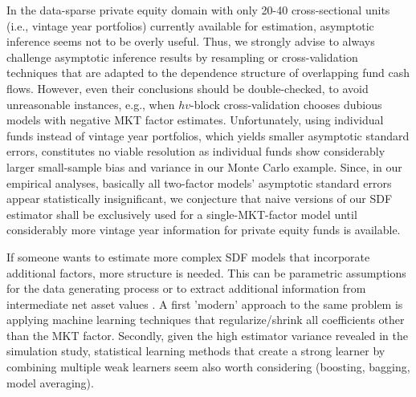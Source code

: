\documentclass[12pt]{article}
\begin{document}
In the data-sparse private equity domain with only 20-40 cross-sectional units (i.e., vintage year portfolios) currently available for estimation, asymptotic inference seems not to be overly useful.
Thus, we strongly advise to always challenge asymptotic inference results by resampling or cross-validation techniques that are adapted to the dependence structure of overlapping fund cash flows.
However, even their conclusions should be double-checked, to avoid unreasonable instances, e.g., when $hv$-block cross-validation chooses dubious models with negative MKT factor estimates.
Unfortunately, using individual funds instead of vintage year portfolios, which yields smaller asymptotic standard errors, constitutes no viable resolution as individual funds show considerably larger small-sample bias and variance in our Monte Carlo example.
Since, in our empirical analyses, basically all two-factor models' asymptotic standard errors appear statistically insignificant, we conjecture that naive versions of our SDF estimator shall be exclusively used for a single-MKT-factor model until considerably more vintage year information for private equity funds is available.

If someone wants to estimate more complex SDF models that incorporate additional factors, more structure is needed.
This can be parametric assumptions for the data generating process \citep{ACGP18} or to extract additional information from intermediate net asset values \citep{GSW19,BGG20}.
A first 'modern' approach to the same problem is applying machine learning techniques that regularize/shrink all coefficients other than the MKT factor.
Secondly, given the high estimator variance revealed in the simulation study, statistical learning methods that create a strong learner by combining multiple weak learners seem also worth considering (boosting, bagging, model averaging).









\newpage
\end{document}
